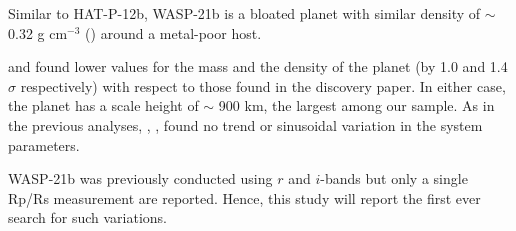 Similar to HAT-P-12b, WASP-21b is a bloated planet with similar density of $\sim$0.32 g cm$^{-3}$ (\cite{Bouchy2010}) around a metal-poor host. 

\cite{Barros2011} and \cite{Ciceri2013} found lower values for the mass and the density of the planet (by 1.0 and 1.4$\sigma$ respectively) with respect to those found in the discovery paper. In either case, the planet has a scale height of $\sim$ 900 km, the largest among our sample.%
As in the previous analyses, \cite{Barros2011}, \cite{Ciceri2013}, \cite{Seelinger2015} found no trend or sinusoidal variation in the system parameters.

WASP-21b was previously conducted using $r$ and $i$-bands but only a single Rp/Rs measurement are reported. Hence, this study will report the first ever search for such variations.


